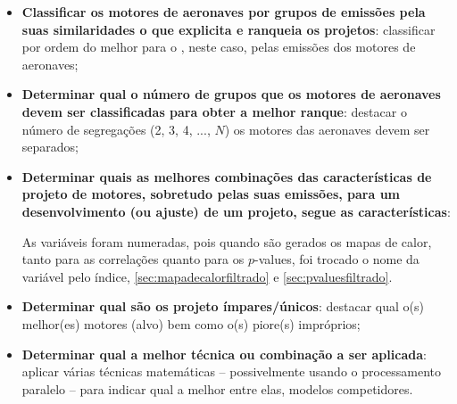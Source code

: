 \documentclass[12pt]{article} %
\begin{document}
		\begin{itemize}
			
			\item \textbf{Classificar os motores de aeronaves por grupos de emissões pela suas similaridades o que explicita e ranqueia os projetos}: classificar por ordem do melhor para o , neste caso, pelas emissões dos motores de aeronaves;
			
			\item \textbf{Determinar qual o número de grupos que os motores de aeronaves devem ser classificadas para obter a melhor ranque}: destacar o número de segregações (2, 3, 4, ..., $ N $) os motores das aeronaves devem ser separados;
			
			\item \textbf{Determinar quais as melhores combinações das características de projeto de motores, sobretudo pelas suas emissões, para um desenvolvimento (ou ajuste) de um projeto, segue as características}:
			
			
			
			As variáveis foram numeradas, pois quando são gerados os mapas de calor, tanto para as correlações quanto para os $ p $-values, foi trocado o nome da variável pelo índice, \autoref{sec:mapadecalorfiltrado} e \autoref{sec:pvaluesfiltrado}.
			
			\item \textbf{Determinar qual são os projeto ímpares/únicos}: destacar qual o(s) melhor(es) motores (alvo) bem como o(s) piore(s) impróprios;
			
			\item \textbf{Determinar qual a melhor técnica ou combinação a ser aplicada}: aplicar várias técnicas matemáticas -- possivelmente usando o processamento paralelo -- para indicar qual a melhor entre elas, modelos competidores.
			
			
			
		\end{itemize}
		
\end{document}
